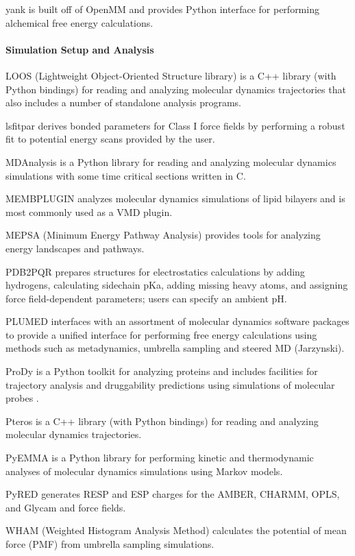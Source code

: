 yank is built off of OpenMM and provides Python interface for performing alchemical free energy calculations.

\paragraph{Simulation Setup and Analysis}

LOOS (Lightweight Object-Oriented Structure library) \cite{Romo_2014} is a C++ library (with Python bindings) for reading and analyzing molecular dynamics trajectories that also includes a number of standalone analysis programs.

lsfitpar \cite{Vanommeslaeghe_2015} derives bonded parameters for Class I force fields by performing a robust fit to potential energy scans provided by the user.

MDAnalysis  \cite{Michaud_Agrawal_2011} is a Python library for reading and analyzing molecular dynamics simulations with some time critical sections written in C.

MEMBPLUGIN \cite{Guixa-Gonzalez_2014} analyzes molecular dynamics simulations of lipid bilayers and is most commonly used as a VMD plugin.

MEPSA (Minimum Energy Pathway Analysis) \cite{Marcos_Alcalde_2015} provides tools for analyzing energy landscapes and pathways.

PDB2PQR \cite{Dolinsky_2007} prepares structures for electrostatics calculations by adding hydrogens, calculating sidechain pKa, adding missing heavy atoms, and assigning force field-dependent parameters; users can specify an ambient pH.

PLUMED \cite{Tribello_2014} interfaces with an assortment of molecular dynamics software packages to provide a unified interface for performing free energy calculations using methods such as metadynamics, umbrella sampling and steered MD (Jarzynski).

ProDy \cite{Bakan_2011} is a Python toolkit for analyzing proteins and includes facilities for trajectory analysis and druggability predictions using simulations of molecular probes \cite{Bakan_2012}.

Pteros \cite{Yesylevskyy_2015} is a C++ library (with Python bindings) for reading and analyzing molecular dynamics trajectories.

PyEMMA \cite{Scherer_2015} is a Python library for performing kinetic and thermodynamic analyses of molecular dynamics simulations using Markov models. 

PyRED \cite{Dupradeau_2010} generates RESP and ESP charges for the AMBER, CHARMM, OPLS, and Glycam and force fields.

WHAM (Weighted Histogram Analysis Method) calculates the potential of mean force (PMF) from umbrella sampling simulations.

